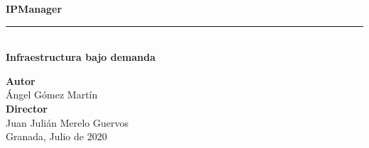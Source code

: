 \begin{titlepage}
 
 
\setlength{\centeroffset}{-0.5\oddsidemargin}
\addtolength{\centeroffset}{0.5\evensidemargin}
\thispagestyle{empty}

\noindent\hspace*{\centeroffset}\begin{minipage}{\textwidth}

\centering


\vspace{3.3cm}


{\Huge\bfseries IPManager}
\noindent\rule[-1ex]{\textwidth}{3pt}\\[3.5ex]
{\large\bfseries Infraestructura bajo demanda\\[4cm]}
\end{minipage}

\vspace{2.5cm}
\noindent\hspace*{\centeroffset}\begin{minipage}{\textwidth}
\centering

\textbf{Autor}\\ {Ángel Gómez Martín}\\[2.5ex]
\textbf{Director}\\
{Juan Julián Merelo Guervos}\\[2cm]
Granada, Julio de 2020
\end{minipage}

 
\end{titlepage}



